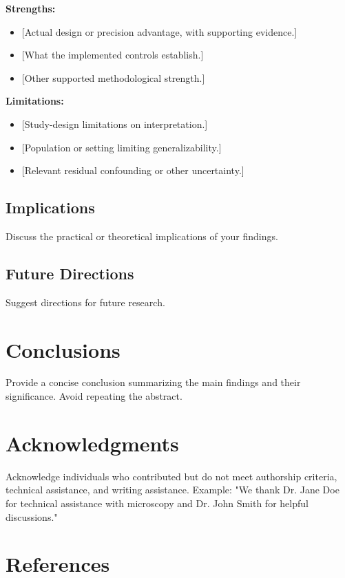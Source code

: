 \documentclass[10pt,letterpaper]{article}
\begin{document}
\textbf{Strengths:}
\begin{itemize}
    \item {[Actual design or precision advantage, with supporting evidence.]}
    \item {[What the implemented controls establish.]}
    \item {[Other supported methodological strength.]}
\end{itemize}

\textbf{Limitations:}
\begin{itemize}
    \item {[Study-design limitations on interpretation.]}
    \item {[Population or setting limiting generalizability.]}
    \item {[Relevant residual confounding or other uncertainty.]}
\end{itemize}

\subsection*{Implications}
Discuss the practical or theoretical implications of your findings.

\subsection*{Future Directions}
Suggest directions for future research.

\section*{Conclusions}

Provide a concise conclusion summarizing the main findings and their significance. Avoid repeating the abstract.

\section*{Acknowledgments}

Acknowledge individuals who contributed but do not meet authorship criteria, technical assistance, and writing assistance. Example: "We thank Dr. Jane Doe for technical assistance with microscopy and Dr. John Smith for helpful discussions."

\section*{References}
\end{document}
